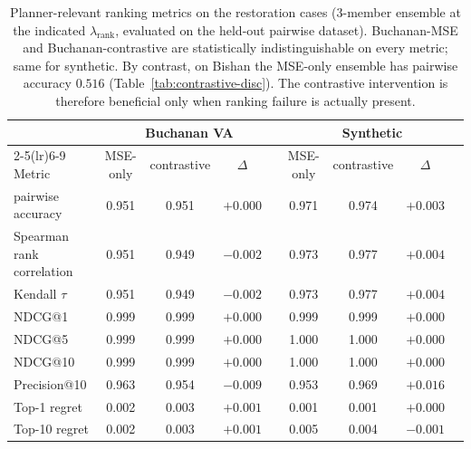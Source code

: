 \documentclass[11pt]{article}
\begin{document}
\begin{table}[htbp]
\centering
\small
\caption{Planner-relevant ranking metrics on the restoration cases (3-member ensemble at the indicated $\lambda_{\text{rank}}$, evaluated on the held-out pairwise dataset). Buchanan-MSE and Buchanan-contrastive are statistically indistinguishable on every metric; same for synthetic. By contrast, on Bishan the MSE-only ensemble has pairwise accuracy $0.516$ (Table~\ref{tab:contrastive-disc}). The contrastive intervention is therefore beneficial only when ranking failure is actually present.}
\label{tab:restoration-ranking}
\begin{tabular}{l@{\hspace{0.5em}}cccc@{\hspace{0.5em}}cccc}
\toprule
 & \multicolumn{4}{c}{Buchanan VA} & \multicolumn{4}{c}{Synthetic} \\
\cmidrule(lr){2-5}\cmidrule(lr){6-9}
Metric & MSE-only & contrastive & $\Delta$ & & MSE-only & contrastive & $\Delta$ & \\
\midrule
pairwise accuracy            & 0.951 & 0.951 & $+0.000$ & & 0.971 & 0.974 & $+0.003$ & \\
Spearman rank correlation    & 0.951 & 0.949 & $-0.002$ & & 0.973 & 0.977 & $+0.004$ & \\
Kendall $\tau$               & 0.951 & 0.949 & $-0.002$ & & 0.973 & 0.977 & $+0.004$ & \\
NDCG@1                       & 0.999 & 0.999 & $+0.000$ & & 0.999 & 0.999 & $+0.000$ & \\
NDCG@5                       & 0.999 & 0.999 & $+0.000$ & & 1.000 & 1.000 & $+0.000$ & \\
NDCG@10                      & 0.999 & 0.999 & $+0.000$ & & 1.000 & 1.000 & $+0.000$ & \\
Precision@10                 & 0.963 & 0.954 & $-0.009$ & & 0.953 & 0.969 & $+0.016$ & \\
Top-1 regret                 & 0.002 & 0.003 & $+0.001$ & & 0.001 & 0.001 & $+0.000$ & \\
Top-10 regret                & 0.002 & 0.003 & $+0.001$ & & 0.005 & 0.004 & $-0.001$ & \\
\bottomrule
\end{tabular}
\end{table}
\end{document}
